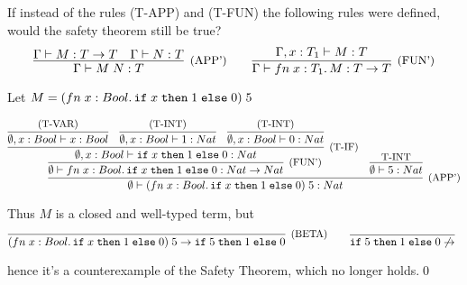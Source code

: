 \subsection{}

If instead of the rules (T-APP) and (T-FUN) the following rules were defined,
would the safety theorem still be true?
\[
	\infer[\text{\small{(APP')}}]
	{\Gamma \vdash \APP{M}{N}: T}
	{
		\Gamma \vdash M: T \to T &
		\Gamma \vdash N: T
	}
	\qquad
	\infer[\text{\small{(FUN')}}]
	{\Gamma \vdash \FN{x: T_1}{M}: T \to T}
	{\Gamma, x: T_1 \vdash M: T}
\]

Let $M = (fn\;x:Bool.\,\texttt{if}\;x\;\texttt{then}\;1\;\texttt{else}\;0)\;5$

\[
	\infer[\text{\small{(APP')}}]
	{\emptyset \vdash \APP{(\FN{x:Bool}{\IF{x}{1}{0}})}{5}: Nat}
	{
		\infer[\text{\small{(FUN')}}]
		{ \emptyset \vdash \FN{x:Bool}{\IF{x}{1}{0}}: Nat \to Nat }
		{
			\infer[\text{\small{(T-IF)}}]
			{ \emptyset, x: Bool \vdash \IF{x}{1}{0}: Nat }
			{
				\infer{ \emptyset, x: Bool \vdash x: Bool }{\text{\small{(T-VAR)}}} &
				\infer{ \emptyset, x: Bool \vdash 1: Nat }{\text{\small{(T-INT)}}} &
				\infer{ \emptyset, x: Bool \vdash 0: Nat }{\text{\small{(T-INT)}}}
			}
		}
		&
		\infer{ \emptyset \vdash 5: Nat }{\text{\small{T-INT}}}
	}
\]

Thus $M$ is a closed and well-typed term, but
\[
	\infer[\text{\small{(BETA)}}]
	{\APP{(\FN{x:Bool}{\IF{x}{1}{0}})}{5} \to \IF{5}{1}{0}}{}
	\qquad
	\infer[]{\IF{5}{1}{0} \not\to}{}
\]

hence it's a counterexample of the Safety Theorem, which no longer holds.\qed
